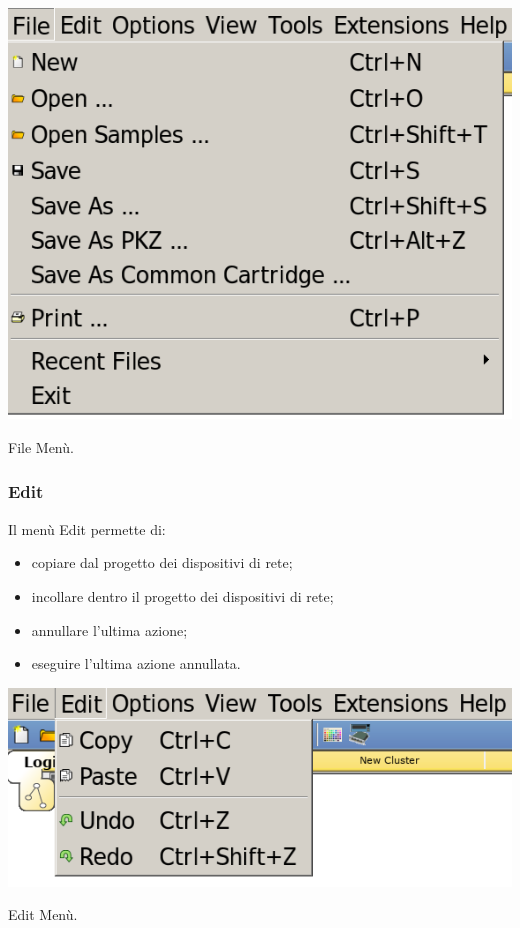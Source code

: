 \begin{sfigure}
    \centering
    \captionsetup{type=figure}
    \includegraphics[scale=.35]{images/02.packet-tracer/file.png}
    \caption{File Menù.}
\end{sfigure}

\subsubsection{Edit}
Il menù Edit permette di:

\begin{itemize}
    \item copiare dal progetto dei dispositivi di rete;
    \item incollare dentro il progetto dei dispositivi di rete;
    \item annullare l'ultima azione;
    \item eseguire l'ultima azione annullata.
\end{itemize}

\begin{sfigure}
    \centering
    \captionsetup{type=figure}
    \includegraphics[scale=.35]{images/02.packet-tracer/edit.png}
    \caption{Edit Menù.}
\end{sfigure}

